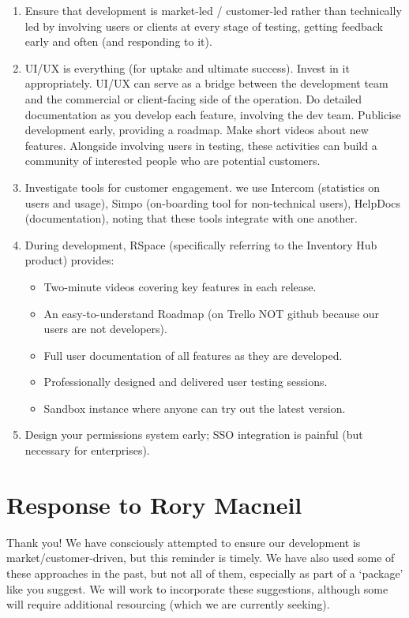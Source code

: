 \documentclass[a4paper,headings=small fontsize=10pt]{scrreprt}
\begin{document}
\begin{enumerate}
  \def\labelenumii{\alph{enumii}.}
  
\item Ensure that development is market-led / customer-led rather than technically led by 
   involving users or clients at every stage of testing, getting feedback early and often 
   (and responding to it). 
   
\item UI/UX is everything (for uptake and ultimate success). Invest in it appropriately. UI/UX can serve as a bridge 
   between the development team and the commercial or client-facing side of the operation.
   Do detailed documentation as you develop each feature, involving the dev team. Publicise
   development early, providing a roadmap. Make short videos about new features. 
   Alongside involving users in testing, these activities
   can build a community of interested people who are potential customers. 
   
\item Investigate tools for customer engagement. we use Intercom (statistics on users and usage),
   Simpo (on-boarding tool for non-technical users), HelpDocs (documentation), noting that these tools 
   integrate with one another.
   
\item During development, RSpace (specifically referring to the Inventory Hub product) provides:
   \begin{itemize}
     \item Two-minute videos covering key features in each release.
     \item An easy-to-understand Roadmap (on Trello NOT github because our users are not developers).
     \item Full user documentation of all features as they are developed.
     \item Professionally designed and delivered user testing sessions.
     \item Sandbox instance where anyone can try out the latest version.
   \end{itemize}
\item Design your permissions system early; SSO integration is painful (but necessary for enterprises).

\end{enumerate}

\section{Response to Rory Macneil}

Thank you! We have consciously attempted to ensure our development is market/customer-driven, 
but this reminder is timely. We have also used some of these approaches in the past, but 
not all of them, especially as part of a `package' like you suggest. We will work to 
incorporate these suggestions, although some will require additional resourcing 
(which we are currently seeking).
   
\end{document}
